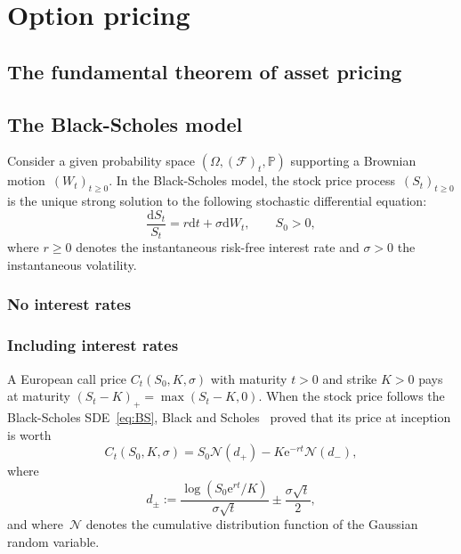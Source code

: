 \documentclass[a4paper]{article}
\theoremstyle{definition}
\newcommand{\D}{\mathrm{d}}
\newcommand{\E}{\mathrm{e}}
\numberwithin{equation}{section}
\begin{document}

\setcounter{tocdepth}{4}
\tableofcontents
\newpage
%
\fancyhead{}
\fancyfoot{}
\pagestyle{fancy} 
\fancyhead[RO,LE]{\sffamily\small \thepage}
\fancyhead[LO,RE]{\sffamily\small \nouppercase{\rightmark}}
\renewcommand{\headrulewidth}{0.4pt}
\renewcommand{\footrulewidth}{0.0pt}

%
%
%
%





\section{Option pricing}
\subsection{The fundamental theorem of asset pricing}

\subsection{The Black-Scholes model}
Consider a given probability space $(\Omega, (\mathcal{F})_t,\mathbb{P})$ 
supporting a Brownian motion~$(W_t)_{t\geq 0}$.
In the Black-Scholes model, the stock price process~$(S_t)_{t\geq 0}$ is the unique strong solution to
the following stochastic differential equation:
\begin{equation}\label{eq:BS}
\frac{\D S_t}{S_t} = r \D t + \sigma \D W_t,
\qquad S_0>0,
\end{equation}
where $r\geq 0$ denotes the instantaneous risk-free interest rate and $\sigma>0$ the instantaneous volatility.

\subsubsection{No interest rates}
\subsubsection{Including interest rates}
A European call price $C_t(S_0,K,\sigma)$ with maturity $t>0$ and strike $K>0$ 
pays at maturity $(S_t-K)_+=\max(S_t-K,0)$. 
When the stock price follows the Black-Scholes SDE~\eqref{eq:BS}, 
Black and Scholes~\cite{BS73} proved that its price at inception is worth
$$
C_t(S_0,K,\sigma) = S_0\mathcal{N}(d_+) - K\E^{-rt}\mathcal{N}(d_-),
$$
where
$$
d_{\pm} := \frac{\log\left(S_0 \E^{rt}/K\right)}{\sigma\sqrt{t}} \pm \frac{\sigma\sqrt{t}}{2},
$$
and where~$\mathcal{N}$ denotes the cumulative distribution function of the Gaussian random variable.
\end{document}
